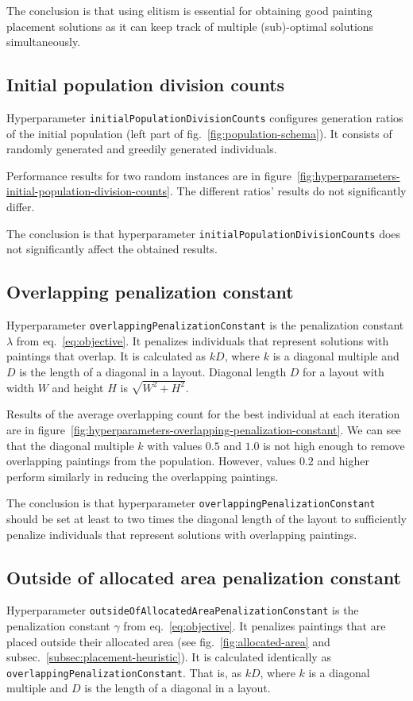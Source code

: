 The conclusion is that  using elitism is essential for obtaining good painting placement solutions
as it can keep track of multiple (sub)-optimal solutions simultaneously.


\subsection{Initial population division counts}\label{subsec:initial-population-division-counts}
Hyperparameter \verb|initialPopulationDivisionCounts| configures generation ratios of the initial population (left part of fig.~\ref{fig:population-schema}).
It consists of randomly generated and greedily generated individuals.

Performance results for two random instances are in figure~\ref{fig:hyperparameters-initial-population-division-counts}.
The different ratios' results do not significantly differ.

The conclusion is that hyperparameter \verb|initialPopulationDivisionCounts| does not significantly affect the obtained results.

\subsection{Overlapping penalization constant}\label{subsec:overlapping-penalization-constant}

Hyperparameter \verb|overlappingPenalizationConstant| is the penalization constant $\lambda$ from eq.~\ref{eq:objective}.
It penalizes individuals that represent solutions with paintings that overlap.
It is calculated as $kD$, where $k$ is a diagonal multiple and $D$ is the length of a diagonal in a layout.
Diagonal length $D$ for a layout with width $W$ and height  $H$ is $\sqrt{W^2 + H^2}$.

Results of the average overlapping count for the best individual at each iteration are in figure~\ref{fig:hyperparameters-overlapping-penalization-constant}.
We can see that the diagonal multiple $k$ with values $0.5$ and $1.0$ is not high enough to remove overlapping paintings from the population.
However, values $0.2$ and higher perform similarly in reducing the overlapping paintings.

The conclusion is that hyperparameter \verb|overlappingPenalizationConstant| should be set at least to
two times the diagonal length of the layout to sufficiently penalize individuals that represent solutions with overlapping paintings.

\subsection{Outside of allocated area penalization constant}\label{subsec:outside-of-allocated-area-penalization-constant}
Hyperparameter \verb|outsideOfAllocatedAreaPenalizationConstant| is the penalization constant $\gamma$ from eq.~\ref{eq:objective}.
It penalizes paintings that are placed outside their allocated area (see fig.~\ref{fig:allocated-area} and subsec.~\ref{subsec:placement-heuristic}).
It is calculated identically as \verb|overlappingPenalizationConstant|.
That is, as $kD$, where $k$ is a diagonal multiple and $D$ is the length of a diagonal in a layout.

